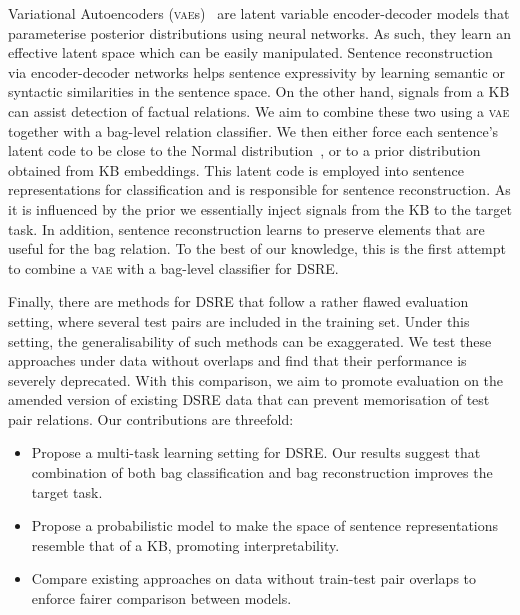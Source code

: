 \documentclass[11pt]{article}
\begin{document}
Variational Autoencoders (\textsc{vae}s)~\citep{kingma2013auto} are latent variable encoder-decoder models that parameterise posterior distributions using neural networks. As such, they learn an effective latent space which can be easily manipulated. 
Sentence reconstruction via encoder-decoder networks helps sentence expressivity by learning semantic or syntactic similarities in the sentence space. On the other hand, signals from a KB can assist detection of factual relations. 
We aim to combine these two using a \textsc{vae} together with a bag-level relation classifier. We then either force each sentence's latent code to be close to the Normal distribution~\citep{bowman2016generating}, or to a prior distribution obtained from KB embeddings. This latent code is employed into sentence representations for classification and is responsible for sentence reconstruction. As it is influenced by the prior we essentially inject signals from the KB to the target task.
In addition, sentence reconstruction learns to preserve elements that are useful for the bag relation.
To the best of our knowledge, this is the first attempt to combine a \textsc{vae} with a bag-level classifier for DSRE.

Finally, there are methods for DSRE that follow a rather flawed evaluation setting, where several test pairs are included in the training set. Under this setting, the generalisability of such methods can be exaggerated.
We test these approaches under data without overlaps and find that their performance is severely deprecated. With this comparison, we aim to promote evaluation on the amended version of existing DSRE data that can prevent memorisation of test pair relations. 
Our contributions are threefold: \vspace{-0.23cm}
\begin{itemize}[noitemsep,leftmargin=*]
    \item Propose a multi-task learning setting for DSRE. Our results suggest that combination of both bag classification and bag reconstruction improves the target task.
    
    \item Propose a probabilistic model to make the space of sentence representations resemble that of a KB, promoting interpretability.
    
    \item Compare existing approaches on data without train-test pair overlaps to enforce fairer comparison between models.
\end{itemize}
\end{document}
